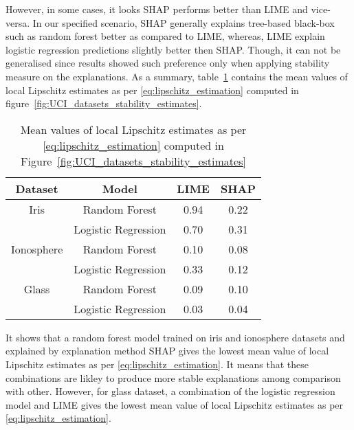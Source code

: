 \documentclass[english]{tktltiki2}
\theoremstyle{definition}
\theoremstyle{remark}
\begin{document}
However, in some cases, it looks SHAP performs better than LIME and vice-versa. In our specified scenario, SHAP generally explains tree-based black-box such as random forest better as compared to LIME, whereas, LIME explain logistic regression predictions slightly better then SHAP. Though, it can not be generalised since results showed such preference only when applying stability measure on the explanations. As a summary, table~\ref{table:lipschitz_estimation_aggregated_datasets_UCI} contains the mean values of local Lipschitz estimates as per \eqref{eq:lipschitz_estimation} computed in figure~\ref{fig:UCI_datasets_stability_estimates}.

\begin{table}[H]
	\caption{Mean values of local Lipschitz estimates as per \eqref{eq:lipschitz_estimation} computed in Figure~\ref{fig:UCI_datasets_stability_estimates}}
	\label{table:lipschitz_estimation_aggregated_datasets_UCI}
	\begin{center}
		\begin{tabular}{|c|c|c|c|}
			\hline
			\textbf{Dataset} & \textbf{Model} & \textbf{LIME} & \textbf{SHAP} \\ \hline
			
			Iris & Random Forest & 0.94 & 0.22  \\ \hline
			& Logistic Regression & 0.70 & 0.31 \\ \hline
			
			Ionosphere & Random Forest & 0.10 & 0.08 \\ \hline
			& Logistic Regression & 0.33 & 0.12 \\ \hline
			
			Glass & Random Forest & 0.09 & 0.10 \\ \hline
			& Logistic Regression & 0.03 & 0.04 \\ \hline
			
		\end{tabular}
	\end{center}
\end{table}

It shows that a random forest model trained on iris and ionosphere datasets and explained by explanation method SHAP gives the lowest mean value of local Lipschitz estimates as per \eqref{eq:lipschitz_estimation}. It means that these combinations are likley to produce more stable explanations among comparison with other. However, for glass dataset, a combination of the logistic regression model and LIME gives the lowest mean value of local Lipschitz estimates as per \eqref{eq:lipschitz_estimation}.
\end{document}
